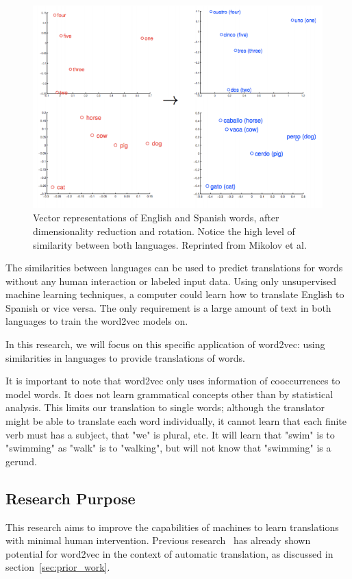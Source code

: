 \begin{figure}[ht!]
  \centering \includegraphics[width=\linewidth]{images/english_spanish}
  \caption{Vector representations of English and Spanish words, after dimensionality reduction and rotation. Notice the high level of similarity between both languages. Reprinted from Mikolov et al.~\cite{mikolov2013exploiting}}
  \label{fig:english_spanish}
\end{figure}

The similarities between languages can be used to predict translations for words without any human interaction or labeled input data. Using only unsupervised machine learning techniques, a computer could learn how to translate English to Spanish or vice versa. The only requirement is a large amount of text in both languages to train the word2vec models on.

In this research, we will focus on this specific application of word2vec: using similarities in languages to provide translations of words.

It is important to note that word2vec only uses information of cooccurrences to model words. It does not learn grammatical concepts other than by statistical analysis. This limits our translation to single words; although the translator might be able to translate each word individually, it cannot learn that each finite verb must has a subject, that "we" is plural, etc. It will learn that "swim" is to "swimming" as "walk" is to "walking", but will not know that "swimming" is a gerund.

\subsection{Research Purpose}
This research aims to improve the capabilities of machines to learn translations with minimal human intervention. Previous research~\cite{mikolov2013exploiting, wolf2014joint} has already shown potential for word2vec in the context of automatic translation, as discussed in section~\ref{sec:prior_work}.

